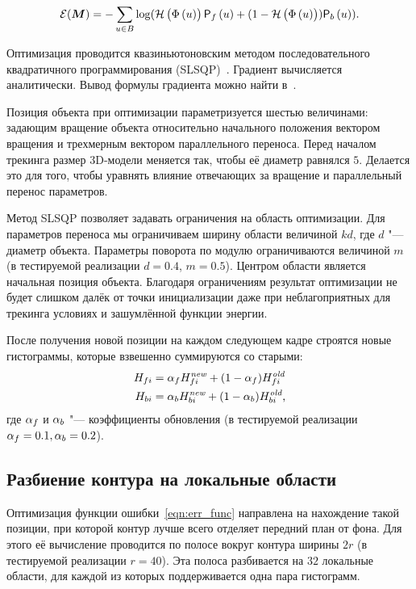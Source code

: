 \begin{equation}\label{eqn:err_func}
    \mathcal{E}(\bm{M}) = - \sum\limits_{\mathnormal{u} \in B}
        \log(\mathcal{H} \left( \Phi \left( \mathnormal{u} \right) \right) \mathsf{P}_f \left( \mathnormal{u} \right) + (1 - \mathcal{H} \left( \Phi \left( \mathnormal{u} \right) \right))\mathsf{P}_b \left( \mathnormal{u} \right))
\text{.}
\end{equation}

Оптимизация проводится квазиньютоновским методом последовательного
квадратичного программирования (SLSQP)~\cite{SLSQP}.
Градиент вычисляется аналитически.
Вывод формулы градиента можно найти в~\cite{Tjaden2018}.

Позиция объекта при оптимизации параметризуется шестью величинами:
задающим вращение объекта относительно начального положения вектором вращения
и трехмерным вектором параллельного переноса.
Перед началом трекинга размер 3D-модели меняется так, чтобы её диаметр равнялся
$5$.
Делается это для того, чтобы уравнять влияние отвечающих за вращение и
параллельный перенос параметров.

Метод SLSQP позволяет задавать ограничения на область оптимизации.
Для параметров переноса мы ограничиваем ширину области величиной $kd$,
где $d$ "--- диаметр объекта.
Параметры поворота по модулю ограничиваются величиной $m$
(в тестируемой реализации $d =0.4$, $m = 0.5$).
Центром области является начальная позиция объекта.
Благодаря ограничениям результат оптимизации не будет слишком далёк от точки
инициализации даже при неблагоприятных для трекинга условиях и зашумлённой
функции энергии.

После получения новой позиции на каждом следующем кадре строятся новые
гистограммы, которые взвешенно суммируются со старыми:
\begin{align}
    H_{fi} &= \alpha_{f} H_{fi}^{\text{\it new}} + (1 - \alpha_{f})
        H_{fi}^{\text{\it old}} \\
    H_{bi} &= \alpha_{b} H_{bi}^{\text{\it new}} + (1 - \alpha_{b})
        H_{bi}^{\text{\it old}}
\text{,}
\end{align}
где $\alpha_{f}$ и $\alpha_{b}$ "--- коэффициенты обновления (в тестируемой
реализации $\alpha_{f} = 0.1, \alpha_{b} = 0.2$).

\subsection{Разбиение контура на локальные области}\label{local-areas}

Оптимизация функции ошибки~\ref{eqn:err_func} направлена на нахождение такой
позиции, при которой контур лучше всего отделяет передний план от фона.
Для этого её вычисление проводится по полосе вокруг контура ширины $2r$ (в
тестируемой реализации $r = 40$).
Эта полоса разбивается на $32$ локальные области, для каждой из
которых поддерживается одна пара гистограмм.

